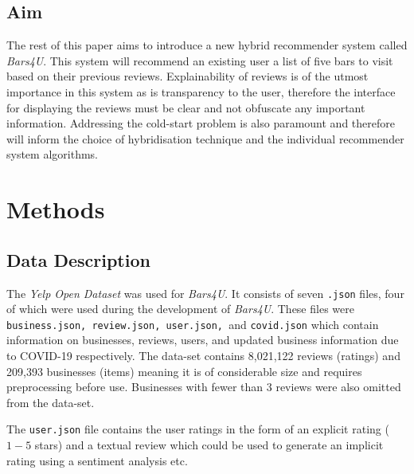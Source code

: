 \documentclass[conference]{IEEEtran}
\begin{document}
\subsection{Aim}
The rest of this paper aims to introduce a new hybrid recommender system called \textit{Bars4U}. This system will recommend an existing user a list of five bars to visit based on their previous reviews. Explainability of reviews is of the utmost importance in this system as is transparency to the user, therefore the interface for displaying the reviews must be clear and not obfuscate any important information. Addressing the cold-start problem is also paramount and therefore will inform the choice of hybridisation technique and the individual recommender system algorithms.


\section{Methods}
\subsection{Data Description}
The \textit{Yelp Open Dataset}\cite{b9} was used for \textit{Bars4U}. It consists of seven \texttt{.json} files, four of which were used during the development of \textit{Bars4U}. These files were \texttt{business.json, review.json, user.json, }and \texttt{covid.json} which contain information on businesses, reviews, users, and updated business information due to COVID-19 respectively. The data-set contains 8,021,122 reviews (ratings) and 209,393 businesses (items) meaning it is of considerable size and requires preprocessing before use. Businesses with fewer than 3 reviews were also omitted from the data-set.
\par The \texttt{user.json} file contains the user ratings in the form of an explicit rating ($1-5$ stars) and a textual review which could be used to generate an implicit rating using a sentiment analysis etc.
\end{document}
